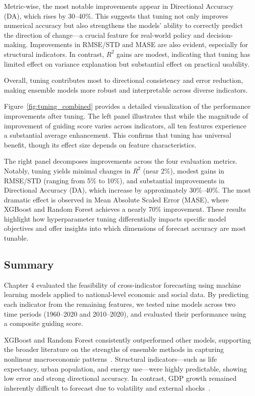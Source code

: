 \documentclass[12pt]{article}
\begin{document}
Metric-wise, the most notable improvements appear in Directional Accuracy (DA), which rises by 30--40\%. This suggests that tuning not only improves numerical accuracy but also strengthens the models' ability to correctly predict the direction of change—a crucial feature for real-world policy and decision-making. Improvements in RMSE/STD and MASE are also evident, especially for structural indicators. In contrast, $R^2$ gains are modest, indicating that tuning has limited effect on variance explanation but substantial effect on practical usability.

Overall, tuning contributes most to directional consistency and error reduction, making ensemble models more robust and interpretable across diverse indicators.

Figure~\ref{fig:tuning_combined} provides a detailed visualization of the performance improvements after tuning. The left panel illustrates that while the magnitude of improvement of guiding score varies across indicators, all ten features experience a substantial average enhancement. This confirms that tuning has universal benefit, though its effect size depends on feature characteristics.

The right panel decomposes improvements across the four evaluation metrics. Notably, tuning yields minimal changes in $R^2$ (near 2\%), modest gains in RMSE/STD (ranging from 5\% to 10\%), and substantial improvements in Directional Accuracy (DA), which increase by approximately 30\%--40\%. The most dramatic effect is observed in Mean Absolute Scaled Error (MASE), where XGBoost and Random Forest achieves a nearly 70\% improvement. 
These results highlight how hyperparameter tuning differentially impacts specific model objectives and offer insights into which dimensions of forecast accuracy are most tunable.

\subsection{Summary}

Chapter 4 evaluated the feasibility of cross-indicator forecasting using machine learning models applied to national-level economic and social data. By predicting each indicator from the remaining features, we tested nine models across two time periods (1960–2020 and 2010–2020), and evaluated their performance using a composite guiding score.

XGBoost and Random Forest consistently outperformed other models, supporting the broader literature on the strengths of ensemble methods in capturing nonlinear macroeconomic patterns~\cite{Mullainathan2017ML, Athey2019ML}. Structural indicators—such as life expectancy, urban population, and energy use—were highly predictable, showing low error and strong directional accuracy. In contrast, GDP growth remained inherently difficult to forecast due to volatility and external shocks~\cite{Loungani2001, ClementsHendry2002}.
\end{document}
